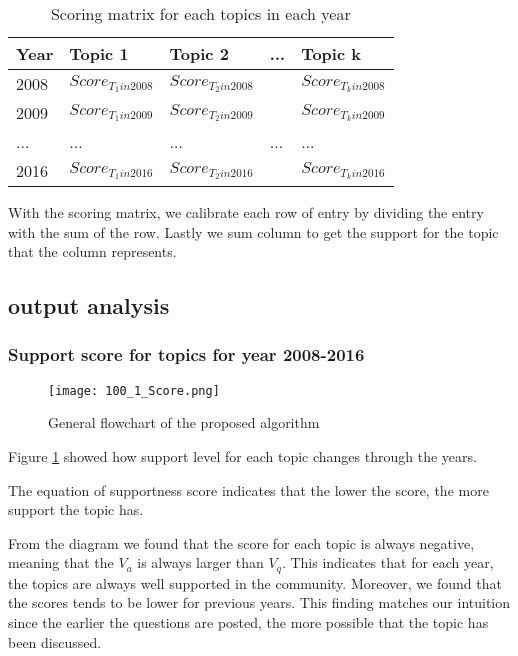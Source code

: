 \begin{table} 
	\centering
	\caption{Scoring matrix for each topics in each year}		
	\label{table:tb1}
	
	\begin{tabular}{ l l l l l }	
		\\		\hline
		Year & Topic 1 & Topic 2 & ... & Topic k\\ \hline  
		2008 & $Score_{T_1in2008}$ & $Score_{T_2in2008}$ &&$Score_{T_kin2008}$ \\
		2009 & $Score_{T_1in2009}$ & $Score_{T_2in2009}$ &&$Score_{T_kin2009}$ \\
		... &...&...&...&...		\\
		2016 & $Score_{T_1in2016}$ & $Score_{T_2in2016}$ &&$Score_{T_kin2016}$ \\
	\end{tabular}
\end{table}


With the scoring matrix, we calibrate each row of entry by dividing the entry with the sum of the row. Lastly we sum column to get the support for the topic that the column represents.


\subsection{output analysis}
\subsubsection{Support score for topics for year 2008-2016}


\begin{figure}
	\center
	\texttt{[image: 100\_1\_Score.png]}
	\caption{General flowchart of the proposed algorithm}
	\label{fig:waterfall}
\end{figure}


Figure \ref{fig:waterfall} showed how support level for each topic changes through the years. 

The equation of supportness score indicates that the lower the score, the more support the topic has.

From the diagram we found that the score for each topic is always negative, meaning that the $V_{a}$ is always larger than $V_{q}$. This indicates that for each year, the topics are always well supported in the community. Moreover, we found that the scores tends to be lower for previous years. This finding matches our intuition since the earlier the questions are posted, the more possible that the topic has been discussed.

